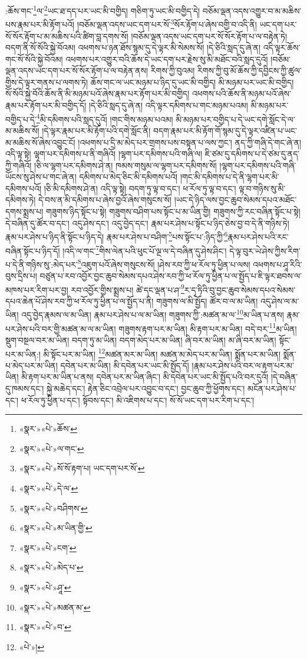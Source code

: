 :ཆོས་གང་\footnote{«སྣར་»«པེ་»ཆོས་}ལ་\footnote{«སྣར་»«པེ་»ལ་གང་}ཡང་ཐ་དད་པར་ཡང་མི་བགྱིད། གཅིག་ཏུ་ཡང་མི་བགྱིད་དེ། བཅོམ་ལྡན་འདས་འགྱུར་བ་མ་མཆིས་པས་རྣམ་པར་མི་རྟོག་པའོ། །བཅོམ་ལྡན་འདས་ཡང་དག་པར་སོ་\footnote{«སྣར་»«པེ་»སོ་སོ་རྟག་པ། ཡང་དག་པར་སོ་}སོར་རྟོག་པ་ཞེས་བགྱི་བ་འདི་ནི། ཡང་དག་པར་སོ་སོར་རྟོག་པ་མ་མཆིས་པའི་ཚིག་བླ་དགས་སོ། །བཅོམ་ལྡན་འདས་ཡང་དག་པར་སོ་སོར་རྟོག་པ་ལ་བརྟེན་ཏེ། བདག་ནི་སོ་སོའི་སྐྱེ་བོའམ། འཕགས་པ་ཉན་ཐོས་སྙམ་དུ་དེ་ལྟར་མི་སེམས་སོ། །དེ་ཅིའི་སླད་དུ་ཞེ་ན། འདི་ལྟར་ཆོས་གང་སོ་སོའི་སྐྱེ་བོའམ། འཕགས་པར་འགྱུར་བའི་ཆོས་དེ་ཡང་དག་པར་རྗེས་སུ་མི་མཐོང་བའི་སླད་དུའོ། །བཅོམ་ལྡན་འདས་ཡང་དག་པར་སོ་སོར་རྟོག་པ་ལ་བརྟེན་ནས། རིགས་ཀྱི་བུའམ། རིགས་ཀྱི་བུ་མོ་ཆོས་ཀྱི་དབྱིངས་ཀྱི་ཚུལ་གྱིས་དེ་ལྟར་གནས་པ་ལགས་ཏེ། ཆོས་གང་ལ་ཡང་མཉམ་པ་ཉིད་དུ་ཡང་མི་བགྱིད། མི་མཉམ་པར་ཡང་མི་བགྱིད། སོ་སོའི་སྐྱེ་བོའི་ཆོས་ནི་མི་མཉམ་པའོ་ཞེས་རྣམ་པར་རྟོག་པར་མི་བགྱིད། འཕགས་པའི་ཆོས་ནི་མཉམ་པའོ་ཞེས་རྣམ་པར་རྟོག་པར་མི་བགྱིད་དོ། །དེ་ཅིའི་སླད་དུ་ཞེ་ན། འདི་ལྟར་དམིགས་པ་གང་མཉམ་པའམ། མི་མཉམ་པར་བགྱིད་པ་དེ་\footnote{«སྣར་»«པེ་»དེ་ལ་}མི་དམིགས་པའི་སླད་དུའོ། །གང་གིས་མཉམ་པའམ། མི་མཉམ་པར་བགྱིད་པ་དེ་ཡང་དགེ་སློང་དེ་ལ་མ་མཆིས་སོ། །དེ་ལྟར་རྣམ་པར་མི་རྟོག་པའི་དགེ་སློང་ནི། བདག་རྣམ་པར་མི་རྟོག་གོ་སྙམ་དུ་དེ་ལྟར་འཛིན་པ་ཡང་མ་མཆིས་སོ་ཞེས་འབྱུང་ངོ། །འཕགས་པ་དྲི་མ་མེད་པར་གྲགས་པས་བསྟན་པ་ལས་ཀྱང་། ནད་ཀྱི་གཞི་དེ་གང་ཞེ་ན། འདི་ལྟ་སྟེ། ལྷག་པར་དམིགས་པ་ནི་གཞིའོ། །ལྷག་པར་དམིགས་པའི་གཞི་ལ། ཇི་ཙམ་དུ་དམིགས་པ་དེ་ཙམ་དུ་ནད་ཀྱི་གཞིའོ། །ཅི་ལ་ལྷག་པར་དམིགས་ཤེ་ན། ཁམས་གསུམ་ལ་ལྷག་པར་དམིགས་སོ། །ལྷག་པར་དམིགས་པའི་གཞི་ཡོངས་སུ་ཤེས་པ་གང་ཞེ་ན། དམིགས་པ་མེད་ཅིང་མི་དམིགས་པའོ། །གང་མི་དམིགས་པ་དེ་ནི་ལྷག་པར་མི་དམིགས་པའོ། །ཅི་མི་དམིགས་ཤེ་ན། འདི་ལྟ་སྟེ། བདག་ཏུ་ལྟ་བ་དང་། ཕ་རོལ་ཏུ་ལྟ་བ་དང་། ལྟ་བ་གཉིས་སུ་མི་དམིགས་ཏེ། དེ་བས་ན་མི་དམིགས་པ་ཞེས་བྱའོ་ཞེས་གསུངས་སོ། །ཡང་དེ་ཉིད་ལས་བྱང་ཆུབ་སེམས་དཔའ་མཐོང་དགས་སྨྲས་པ། གཟུགས་ཉིད་སྟོང་པ་སྟེ། གཟུགས་བཤིག་པས་སྟོང་པ་མ་ཡིན་གྱི། གཟུགས་ཀྱི་རང་བཞིན་སྟོང་པ་སྟེ། དེ་བཞིན་དུ་ཚོར་བ་དང་། འདུ་ཤེས་དང་། འདུ་བྱེད་དང་། རྣམ་པར་ཤེས་པ་སྟོང་པ་ཉིད་ཅེས་བྱ་བ་དེ་ནི་གཉིས་ཏེ། རྣམ་པར་ཤེས་པ་ཉིད་ནི་སྟོང་པ་ཉིད་དེ། རྣམ་པར་ཤེས་པ་བཤིག་\footnote{«སྣར་»«པེ་»བཤིགས་}པས་སྟོང་པ་:ཉིད་ཀྱི་\footnote{«སྣར་»«པེ་»མ་ཡིན་གྱི་}རྣམ་པར་ཤེས་པའི་རང་བཞིན་སྟོང་པ་ཉིད་དོ། །འདི་ལ་གང་\footnote{«སྣར་»«པེ་»ངག་}གིས་ལེན་པའི་ཕུང་པོ་ལྔ་ལ་དེ་བཞིན་དུ་ཤེས་ཤིང་། དེ་ལྟ་བུར་ཡེ་ཤེས་ཀྱིས་རིག་པ་དེ་ནི་གཉིས་སུ་:མེད་པར་\footnote{«སྣར་»«པེ་»མེད་པ་}འཇུག་པའོ་ཞེས་གསུངས་སོ། །ཤེས་རབ་ཀྱི་ཕ་རོལ་ཏུ་ཕྱིན་པ་ལས། འཕགས་པ་ཤཱ་རིའི་བུས་དྲིས་པ། བཙུན་པ་རབ་འབྱོར་བྱང་ཆུབ་སེམས་དཔའ་ཤེས་རབ་ཀྱི་ཕ་རོལ་ཏུ་ཕྱིན་པ་ལ་སྤྱོད་པ་ཇི་ལྟར་ཐབས་ལ་མཁས་པར་རིག་པར་བྱ། རབ་འབྱོར་གྱིས་སྨྲས་པ། ཚེ་དང་ལྡན་པ་ཤ་\footnote{«སྣར་»«པེ་»ཤཱ་}ར་དྭ་ཏིའི་བུ་བྱང་ཆུབ་སེམས་དཔའ་སེམས་དཔའ་ཆེན་པོ་ཤེས་རབ་ཀྱི་ཕ་རོལ་ཏུ་ཕྱིན་པ་ལ་སྤྱོད་པ་ནི། གཟུགས་ལ་མི་སྤྱོད། ཚོར་བ་ལ་མ་ཡིན། འདུ་ཤེས་ལ་མ་ཡིན། འདུ་བྱེད་རྣམས་ལ་མ་ཡིན། རྣམ་པར་ཤེས་པ་ལ་མ་ཡིན། གཟུགས་ཀྱི་:མཚན་མ་ལ་\footnote{«སྣར་»«པེ་»མཚན་མ་}མ་ཡིན་པ་ནས། རྣམ་པར་ཤེས་པའི་བར་གྱི་མཚན་མ་ལ་མ་ཡིན། གཟུགས་རྟག་པར་མ་ཡིན། མི་རྟག་པར་མ་ཡིན། བདེ་བར་\footnote{«སྣར་»«པེ་»བ་}མ་ཡིན། སྡུག་བསྔལ་བར་མ་ཡིན། བདག་ཏུ་མ་ཡིན། བདག་མེད་པར་མ་ཡིན། ཞི་བར་མ་ཡིན། མ་ཞི་བར་མ་ཡིན། སྟོང་པར་མ་ཡིན:། མི་སྟོང་པར་མ་ཡིན། \footnote{«པེ་»།  }མཚན་མར་མ་ཡིན། མཚན་མ་མེད་པར་མ་ཡིན། སྨོན་པར་མ་ཡིན། སྨོན་པ་མེད་པར་མ་ཡིན། དབེན་པར་མ་ཡིན། མི་དབེན་པར་ཡང་མི་སྤྱོད་དོ། །རྣམ་པར་ཤེས་པའི་བར་ལ་རྟག་པར་མ་ཡིན། མི་རྟག་པར་མ་ཡིན་པ་ནས། དབེན་པར་མ་ཡིན་ཞིང་། མི་དབེན་པར་ཡང་མི་སྤྱོད་པའི་བར་དུའོ། །དེ་བཞིན་དུ་ཁམས་དང་། སྐྱེ་མཆེད་དང་། རྟེན་ཅིང་འབྲེལ་པར་འབྱུང་བ་དང་། བྱང་ཆུབ་ཀྱི་ཕྱོགས་དང་། མངོན་པར་ཤེས་པ་དང་། ཕ་རོལ་ཏུ་ཕྱིན་པ་དང་། སྟོབས་དང་། མི་འཇིགས་པ་དང་། སོ་སོ་ཡང་དག་པར་རིག་པ་དང་། 